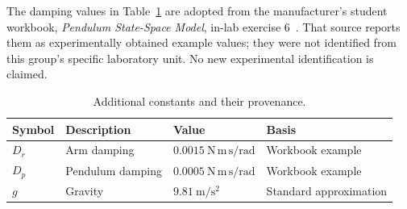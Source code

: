 \documentclass[11pt,a4paper]{article}
\begin{document}
The damping values in Table~\ref{tab:additional} are adopted from the
manufacturer's student workbook, \emph{Pendulum State-Space Model}, in-lab
exercise 6~\cite{qube_courseware}. That source reports them as experimentally
obtained example values; they were not identified from this group's
specific laboratory unit. No new experimental identification is claimed.
\begin{table}[H]\centering
\caption{Additional constants and their provenance.}
\label{tab:additional}
\begin{tabular}{llll}
\toprule
\textbf{Symbol}&\textbf{Description}&\textbf{Value}&\textbf{Basis}\\
\midrule
$D_r$&Arm damping&$0.0015~\mathrm{N\,m\,s/rad}$&Workbook example\\
$D_p$&Pendulum damping&$0.0005~\mathrm{N\,m\,s/rad}$&Workbook example\\
$g$&Gravity&$9.81~\mathrm{m/s^2}$&Standard approximation\\
\bottomrule
\end{tabular}
\end{table}
\end{document}
